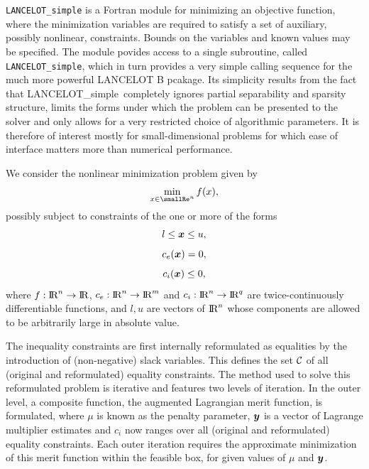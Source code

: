 \documentclass{galahad}
\newcommand{\packagename}{LANCELOT\_simple}
\renewcommand{\Re}{\hbox{I\hskip -1.5pt R}}
\begin{document}
\galheader


\galsummary

{\tt \packagename} is a Fortran module for minimizing an objective function,
where the minimization variables are required to satisfy a set of auxiliary,
possibly nonlinear, constraints.  Bounds on the variables and known values may
be specified.  The module povides access to a single subroutine, called {\tt
LANCELOT\_simple}, which in turn provides a very simple calling sequence for
the much more powerful LANCELOT B pcakage.  Its simplicity results from the
fact that \packagename\ completely ignores partial separability and sparsity
structure, limits the forms under which the problem can be presented to the
solver and only allows for a very restricted choice of algorithmic parameters.
It is therefore of interest mostly for small-dimensional problems for which
ease of interface matters more than numerical performance.

\galbasics

We consider the nonlinear minimization problem given by
\[
\min_{x \in \smallRe^n} f( x ),
\]
possibly subject to constraints of the one or more of the forms
\[
l \leq  {\bm{x}} \leq u,
\]
\[
c_e( {\bm{x}} )  = 0,
\]
\[
c_i( {\bm{x}} ) \leq 0,
\]
where $f: \Re^n \rightarrow \Re$, $c_e: \Re^n \rightarrow \Re^{m}$ and
$c_i: \Re^n \rightarrow \Re^{q}$ are twice-continuously differentiable
functions, and $l, u$ are vectors of $\Re^n$ whose components are allowed
to be arbitrarily large in absolute value.

The inequality constraints are first internally reformulated as equalities by
the introduction of (non-negative) slack variables. This defines the set
$\calC$ of all (original and reformulated) equality constraints. The method
used to solve this reformulated problem is iterative and features two levels of
iteration. In the outer level, a composite function, the augmented Lagrangian
merit function,
is formulated, where $\mu$ is known as the penalty parameter,  ${\bm{y}}$ is a
vector of Lagrange multiplier estimates and $c_i$ now ranges over all
(original and reformulated) equality constraints.  Each outer iteration
requires the approximate minimization of this merit function
within the feasible box, for given values of $\mu$ and ${\bm{y}}$.
\end{document}
